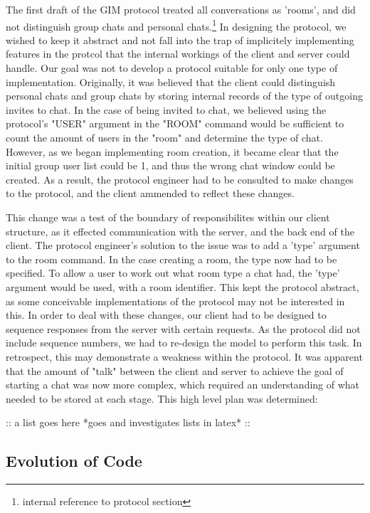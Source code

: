 The first draft of the GIM protocol treated all conversations as 'rooms', and did not distinguish group chats and personal chats.\footnote{internal reference to protocol section} In designing the protocol, we wished to keep it abstract and not fall into the trap of implicitely implementing features in the protcol that the internal workings of the client and server could handle. Our goal was not to develop a protocol suitable for only one type of implementation. Originally, it was believed that the client could distinguish personal chats and group chats by storing internal records of the type of outgoing invites to chat. In the case of being invited to chat, we believed using the protocol's "USER" argument in the "ROOM" command would be sufficient to count the amount of users in the "room" and determine the type of chat. However, as we began implementing room creation, it became clear that the initial group user list could be 1, and thus the wrong chat window could be created. As a result, the protocol engineer had to be consulted to make changes to the protocol, and the client ammended to reflect these changes. 

This change was a test of the boundary of responsibilites within our client structure, as it effected communication with the server, and the back end of the client. The protocol engineer's solution to the issue was to add a 'type' argument to the room command. In the case creating a room, the type now had to be specified. To allow a user to work out what room type a chat had, the 'type' argument would be used, with a room identifier. This kept the protocol abstract, as some conceivable implementations of the protocol may not be interested in this. In order to deal with these changes, our client had to be designed to sequence responses from the server with certain requests. As the protocol did not include sequence numbers, we had to re-design the model to perform this task. In retrospect, this may demonstrate a weakness within the protocol. It was apparent that the amount of "talk" between the client and server to achieve the goal of starting a chat was now more complex, which required an understanding of what needed to be stored at each stage. This high level plan was determined:

:: a list goes here *goes and investigates lists in latex* ::


\subsection{Evolution of Code}
